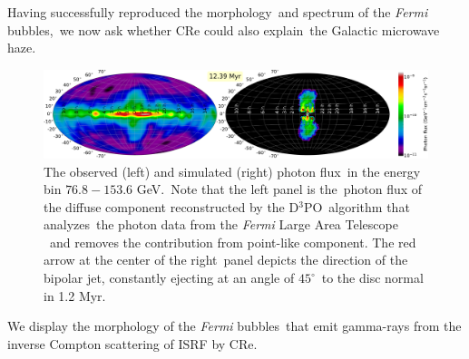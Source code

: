 \documentclass[twocolumn]{aastex631}
\begin{document}

  Having successfully reproduced the morphology\
  and spectrum of the \textit{Fermi} bubbles,\
  we now ask whether CRe could also explain\
  the Galactic microwave haze.



\begin{figure}
  \includegraphics[width=\linewidth]{figures/fig__GammaRay_100e9_1e6_angle_000.png}
  \caption{The observed (left) and simulated (right) photon flux\
           in the energy bin $76.8-153.6$ GeV.\
           Note that the left panel is the\
           photon flux of the diffuse component reconstructed by the D$^3$PO\
           algorithm \citep{Selig2015} that analyzes\
           the photon data from the \textit{Fermi} Large Area Telescope \citep{Atwood2009}\
           and removes the contribution from point-like component.
           The red arrow at the center of the right\
           panel depicts the direction of the bipolar jet, constantly ejecting at an angle of $45^{\circ}$\
           to the disc normal in 1.2 Myr.
  }
  \label{fig__gammaRay-map}
\end{figure}


  We display the morphology of the \textit{Fermi} bubbles\
  that emit gamma-rays from the inverse Compton scattering of ISRF by CRe.
\end{document}
